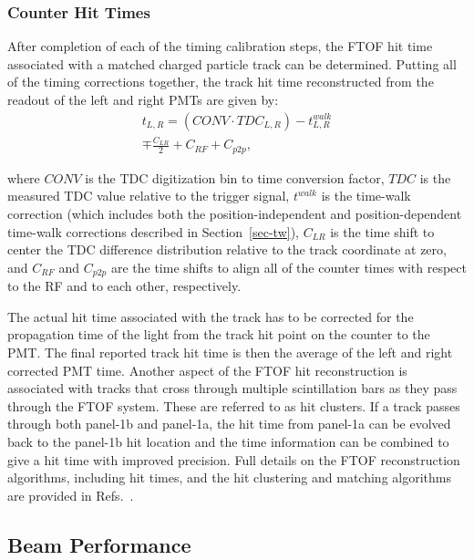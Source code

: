 \documentclass[3p,times,twocolumn]{elsarticle}
\begin{document}
\subsubsection{Counter Hit Times}
\label{cluster}

After completion of each of the timing calibration steps, the FTOF hit time associated with a matched
charged particle track can be determined. Putting all of the timing corrections together, the track hit
time reconstructed from the readout of the left and right PMTs are given by:
\begin{multline}
t_{L,R} = (CONV \cdot TDC_{L,R}) - t_{L,R}^{walk} \\ \mp \frac{C_{LR}}{2} + C_{RF} + C_{p2p},
\end{multline}

\noindent
where $CONV$ is the TDC digitization bin to time conversion factor, $TDC$ is the measured TDC value
relative to the trigger signal, $t^{walk}$ is the time-walk correction (which includes both the
position-independent and position-dependent time-walk corrections described in Section~\ref{sec-tw}),
$C_{LR}$ is the time shift to center the TDC difference distribution relative to the track coordinate at zero,
and $C_{RF}$ and $C_{p2p}$ are the time shifts to align all of the counter times with respect to the RF and to
each other, respectively.

The actual hit time associated with the track has to be corrected for the propagation time of the light from
the track hit point on the counter to the PMT. The final reported track hit time is then the average of
the left and right corrected PMT time. Another aspect of the FTOF hit reconstruction is associated
with tracks that cross through multiple scintillation bars as they pass through the FTOF system. These are
referred to as hit clusters. If a track passes through both panel-1b and panel-1a, the hit time from panel-1a
can be evolved back to the panel-1b hit location and the time information can be combined to give a hit time
with improved precision. Full details on the FTOF reconstruction algorithms, including hit times, and the hit
clustering and matching algorithms are provided in Refs.~\cite{recon-nim,ftof-recon}.

\subsection{Beam Performance}  
\label{sec:beam}
\end{document}

